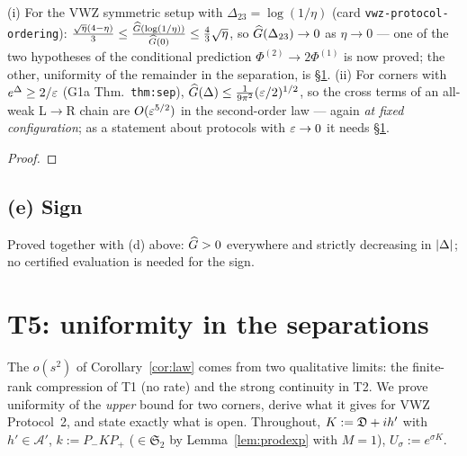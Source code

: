 \documentclass[11pt]{article}
\newcommand{\Pp}{P_+}\newcommand{\Pm}{P_-}\newcommand{\Stwo}{\mathfrak S_2}\newcommand{\Sone}{\mathfrak S_1}
\theoremstyle{definition}\newtheorem{hypothesis}[theorem]{Hypothesis}
\begin{document}
\begin{corollary}\label{cor:W3W4}
(i) For the VWZ symmetric setup with $\Delta_{23}=\log(1/\eta)$ (card \texttt{vwz-protocol-ordering}):
$\frac{\sqrt\eta(4-\eta)}3\le\frac{\widehat G(\log(1/\eta))}{\widehat G(0)}\le\frac43\sqrt\eta$, so
$\widehat G(\Delta_{23})\to0$ as $\eta\to0$ --- one of the two hypotheses of the conditional prediction
$\Phi^{(2)}\to2\Phi^{(1)}$ is now proved; the other, uniformity of the remainder in the separation, is
\S\ref{sec:T5}.  (ii) For corners with $e^{\Delta}\ge2/\varepsilon$ (G1a Thm.~\texttt{thm:sep}),
$\widehat G(\Delta)\le\frac1{9\pi^2}(\varepsilon/2)^{1/2}$, so the cross terms of an all-weak L$\to$R chain are
$O(\varepsilon^{5/2})$ in the second-order law --- again \emph{at fixed configuration}; as a statement about
protocols with $\varepsilon\to0$ it needs \S\ref{sec:T5}.
\end{corollary}
\begin{proof}
\end{proof}
\subsection{(e) Sign}\label{sec:T4e}
Proved together with (d) above: $\widehat G>0$ everywhere and strictly decreasing in $\lvert\Delta\rvert$; no
certified evaluation is needed for the sign.

\section{T5: uniformity in the separations}\label{sec:T5}
The $o(s^2)$ of Corollary~\ref{cor:law} comes from two qualitative limits: the finite-rank compression of
T1 (no rate) and the strong continuity in T2.  We prove uniformity of the \emph{upper} bound for two corners,
derive what it gives for VWZ Protocol~2, and state exactly what is open.  Throughout, $K:=\mathfrak D+ih'$ with
$h'\in\mathcal A'$, $k:=\Pm K\Pp$ ($\in\Stwo$ by Lemma~\ref{lem:prodexp} with $M=1$), $U_\sigma:=e^{\sigma K}$.
\end{document}
